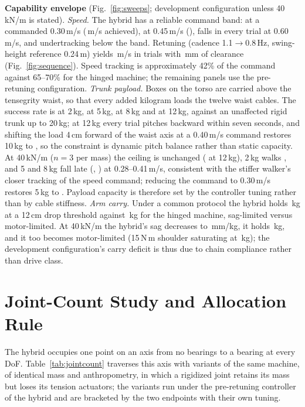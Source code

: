 \documentclass[letterpaper, 10pt, conference]{ieeeconf}
\begin{document}
\textbf{Capability envelope} (Fig.~\ref{fig:sweeps}; development
configuration unless 40\,kN/m is stated). \emph{Speed.} The hybrid has a reliable command band: \hsSpdThirtyRate{} at a
commanded 0.30\,m/s (\hsSpdThirtyV\,m/s achieved), \hsSpdFortyFiveRate{}
at 0.45\,m/s (\hsSpdFortyFiveV), falls in every trial at 0.60\,m/s, and
undertracking below the band. Retuning (cadence 1.1$\to$0.8\,Hz,
swing-height reference 0.24\,m) yields \agilityV\,m/s in \agilityRate{}
trials with \gaitClr\,mm of clearance (Fig.~\ref{fig:sequence}). Speed
tracking is approximately 42\% of the command against 65--70\% for the
hinged machine; the remaining panels use the pre-retuning configuration. \emph{Trunk payload.} Boxes on the torso are carried above
the tensegrity waist, so that every added kilogram loads the twelve waist
cables. The success rate is \hsPayTwoRate{} at 2\,kg, \hsPayFiveRate{} at
5\,kg, \hsPayEightRate{} at 8\,kg and \hsPayTwelveRate{} at 12\,kg, against
an unaffected rigid trunk up to 20\,kg; at 12\,kg every trial pitches
backward within seven seconds, and shifting the load 4\,cm forward of the
waist axis at a 0.40\,m/s command restores 10\,kg to \payTenRate{}, so the
constraint is dynamic pitch balance rather than static capacity. At
40\,kN/m ($n=3$ per mass) the ceiling is unchanged (\stiffPayTwelveRate{}
at 12\,kg), 2\,kg walks \stiffPayTwoRate, and 5 and 8\,kg fall late
(\stiffPayFiveRate, \stiffPayEightRate) at 0.28--0.41\,m/s, consistent
with the stiffer walker's closer tracking of the speed command; reducing the
command to 0.30\,m/s restores 5\,kg to \stiffPayFiveRetuneRate. Payload
capacity is therefore set by the controller tuning rather than by cable
stiffness.
\emph{Arm carry.} Under a common protocol the hybrid holds \carryHybTwelve\,kg at a 12\,cm
drop threshold against \carryHinTwelve\,kg for the hinged machine,
sag-limited versus motor-limited. At 40\,kN/m the hybrid's sag decreases to
\carryStiffSlope\,mm/kg, it holds \carryStiffTwelve\,kg, and it too
becomes motor-limited (15\,N\,m shoulder saturating at
\carryStiffSatMass\,kg); the development configuration's carry deficit is
thus due to chain compliance rather than drive class.

\section{Joint-Count Study and Allocation Rule}
\label{sec:jointcount}
The hybrid occupies one point on an axis from no bearings to a bearing at
every DoF. Table~\ref{tab:jointcount} traverses this axis with variants of
the same machine, of identical mass and anthropometry, in which a
rigidized joint retains its mass but loses its tension actuators; the
variants run under the pre-retuning controller of the hybrid and are
bracketed by the two endpoints with their own tuning.
\end{document}
